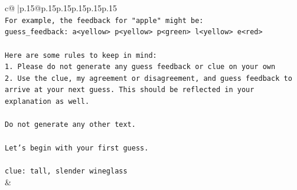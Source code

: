 \documentclass{article}
\begin{document}
{\begin{supertabular}{c@{$\;$}|p{.15\linewidth}@{}p{.15\linewidth}p{.15\linewidth}p{.15\linewidth}p{.15\linewidth}p{.15\linewidth}}
{{{\\ 
\texttt{For example, the feedback for "apple" might be:} \\
\texttt{guess\_feedback: a<yellow> p<yellow> p<green> l<yellow> e<red>} \\
\\ 
\texttt{Here are some rules to keep in mind:} \\
\texttt{1. Please do not generate any guess feedback or clue on your own} \\
\texttt{2. Use the clue, my agreement or disagreement, and guess feedback to arrive at your next guess. This should be reflected in your explanation as well.} \\
\\ 
\texttt{Do not generate any other text.} \\
\\ 
\texttt{Let's begin with your first guess.} \\
\\ 
\texttt{clue: tall, slender wineglass} \\
            }
        }
    }
    & \\ \\


\end{supertabular}}
\end{document}
